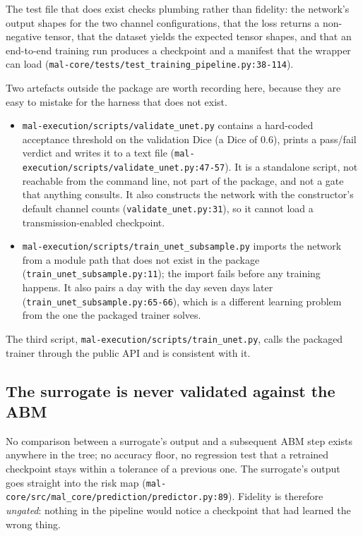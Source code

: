 \documentclass[11pt,a4paper]{article}
\newcommand{\codex}[1]{\texttt{#1}}
\begin{document}
The test file that does exist checks plumbing rather than fidelity: the
network's output shapes for the two channel configurations, that the loss
returns a non-negative tensor, that the dataset yields the expected tensor
shapes, and that an end-to-end training run produces a checkpoint and a
manifest that the wrapper can load
(\codex{mal-core/\allowbreak{}tests/\allowbreak{}test\_\allowbreak{}training\_\allowbreak{}pipeline.py:38-114}).

Two artefacts outside the package are worth recording here, because they are
easy to mistake for the harness that does not exist.

\begin{itemize}
\item \codex{mal-execution/\allowbreak{}scripts/\allowbreak{}validate\_\allowbreak{}unet.py} contains a hard-coded
      acceptance threshold on the validation Dice (a Dice of 0.6), prints a
      pass/fail verdict and writes it to a text file
      (\codex{mal-execution/\allowbreak{}scripts/\allowbreak{}validate\_\allowbreak{}unet.py:47-57}). It is a
      standalone script, not reachable from the command line, not part of the
      package, and not a gate that anything consults. It also constructs the
      network with the constructor's default channel counts
      (\codex{validate\_\allowbreak{}unet.py:31}), so it cannot load a transmission-enabled
      checkpoint.
\item \codex{mal-execution/\allowbreak{}scripts/\allowbreak{}train\_\allowbreak{}unet\_\allowbreak{}subsample.py} imports the
      network from a module path that does not exist in the package
      (\codex{train\_\allowbreak{}unet\_\allowbreak{}subsample.py:11}); the import fails before any
      training happens. It also pairs a day with the day seven days later
      (\codex{train\_\allowbreak{}unet\_\allowbreak{}subsample.py:65-66}), which is a different learning
      problem from the one the packaged trainer solves.
\end{itemize}

The third script, \codex{mal-execution/\allowbreak{}scripts/\allowbreak{}train\_\allowbreak{}unet.py}, calls the
packaged trainer through the public API and is consistent with it.

\subsection{The surrogate is never validated against the ABM}

No comparison between a surrogate's output and a subsequent ABM step exists
anywhere in the tree; no accuracy floor, no regression test that a retrained
checkpoint stays within a tolerance of a previous one. The surrogate's output
goes straight into the risk map
(\codex{mal-core/\allowbreak{}src/\allowbreak{}mal\_\allowbreak{}core/\allowbreak{}prediction/\allowbreak{}predictor.py:89}). Fidelity is
therefore \emph{ungated}: nothing in the pipeline would notice a checkpoint
that had learned the wrong thing.
\end{document}
